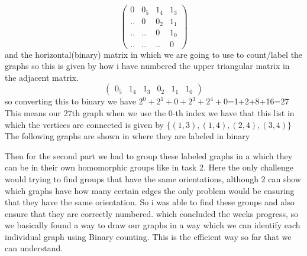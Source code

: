 \documentclass{Assignment}
\begin{document}
\begin{equation}
\begin{pmatrix}
	0&0_5&1_4&1_3\\
	..&0&0_2&1_1\\
	..&..&0&1_0\\
	..&..&..&0
\end{pmatrix}
\end{equation}
and the horizontal(binary) matrix in which we are going to use to count/label the graphs so this is given by how i have numbered the upper triangular matrix in the adjacent matrix.\begin{equation}
	\begin{pmatrix}
		0_5&1_4&1_3&0_2&1_1&1_0
	\end{pmatrix}
\end{equation}
 so converting this to binary we have $2^0+2^1+0+2^3+2^4+0$=1+2+8+16=27\\This means our 27th graph when we use the 0-th index we have that this list in which the vertices are connected is given by $\{(1,3),(1,4),(2,4),(3,4)\}$\\The following graphs are shown in where they are labeled in binary

Then for the second part we had to group these labeled graphs in a which they can be in their own homomorphic groups like in task 2. Here the only challenge would trying to find groups that have the same orientations, although 2 can show which graphs have how many certain edges the only problem would be ensuring that they have the same orientation. So i was able to find these groups and also ensure that they are correctly numbered.
 which concluded the weeks progress, so we basically found a way to draw our graphs in a way which we can identify each individual graph using Binary counting. This is the efficient way so far that we can understand.
\end{document}
